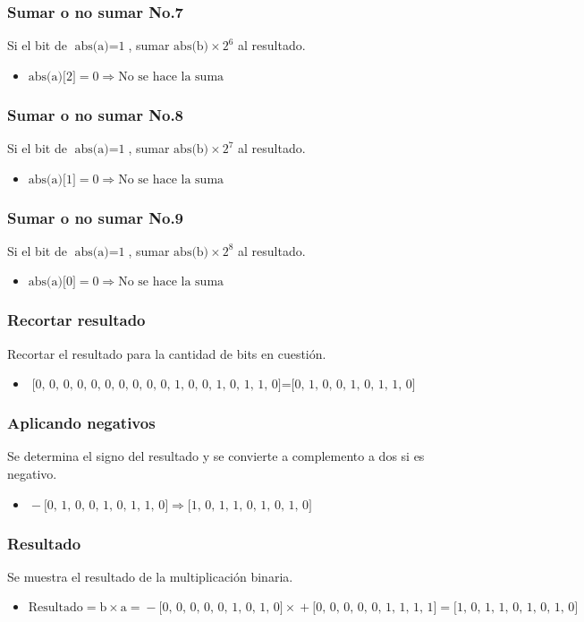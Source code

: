 \documentclass{beamer}
\begin{document}
\begin{frame}
\frametitle{Sumar o no sumar No.7}
Si el bit de $\text{abs(a)}=\text{1}$, sumar $\text{abs(b)}\times\text{2}^{\text{6}}$ al resultado.
\begin{itemize}
\item $\text{abs(a)[2]}=\text{0}\Longrightarrow\text{No se hace la suma}$
\end{itemize}
\end{frame}
\begin{frame}
\frametitle{Sumar o no sumar No.8}
Si el bit de $\text{abs(a)}=\text{1}$, sumar $\text{abs(b)}\times\text{2}^{\text{7}}$ al resultado.
\begin{itemize}
\item $\text{abs(a)[1]}=\text{0}\Longrightarrow\text{No se hace la suma}$
\end{itemize}
\end{frame}
\begin{frame}
\frametitle{Sumar o no sumar No.9}
Si el bit de $\text{abs(a)}=\text{1}$, sumar $\text{abs(b)}\times\text{2}^{\text{8}}$ al resultado.
\begin{itemize}
\item $\text{abs(a)[0]}=\text{0}\Longrightarrow\text{No se hace la suma}$
\end{itemize}
\end{frame}
\begin{frame}
\frametitle{Recortar resultado}
Recortar el resultado para la cantidad de bits en cuestión.
\begin{itemize}
\item $\text{[0, 0, 0, 0, 0, 0, 0, 0, 0, 0, 1, 0, 0, 1, 0, 1, 1, 0]}=\text{[0, 1, 0, 0, 1, 0, 1, 1, 0]}$
\end{itemize}
\end{frame}
\begin{frame}
\frametitle{Aplicando negativos}
Se determina el signo del resultado y se convierte a complemento a dos si es negativo.
\begin{itemize}
\item $\text{}-\text{[0, 1, 0, 0, 1, 0, 1, 1, 0]}\Longrightarrow\text{[1, 0, 1, 1, 0, 1, 0, 1, 0]}$
\end{itemize}
\end{frame}
\begin{frame}
\frametitle{Resultado}
Se muestra el resultado de la multiplicación binaria.
\begin{itemize}
\item $\text{Resultado}=\text{b}\times\text{a}=\text{}-\text{[0, 0, 0, 0, 0, 1, 0, 1, 0]}\times\text{}+\text{[0, 0, 0, 0, 0, 1, 1, 1, 1]}=\text{[1, 0, 1, 1, 0, 1, 0, 1, 0]}$
\end{itemize}
\end{frame}

\begin{frame}
\maketitle
{}
\end{frame}
\end{document}
